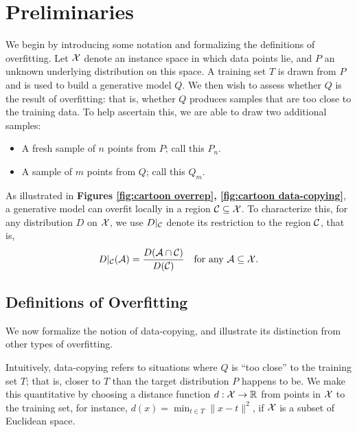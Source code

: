 \section{Preliminaries}

We begin by introducing some notation and formalizing the definitions of overfitting. Let ${\mathcal X}$ denote an instance space in which data points lie, and $P$ an unknown underlying distribution on this space. A training set $T$ is drawn from $P$ and is used to build a generative model $Q$. We then wish to assess whether $Q$ is the result of overfitting: that is, whether $Q$ produces samples that are too close to the training data. To help ascertain this, we are able to draw two additional samples:
\begin{itemize}
\item A fresh sample of $n$ points from $P$; call this $P_n$.
\item A sample of $m$ points from $Q$; call this $Q_m$.
\end{itemize}
As illustrated in \textbf{Figures \ref{fig:cartoon overrep}, \ref{fig:cartoon data-copying}}, a generative model can overfit locally in a region $\mathcal{C} \subseteq \mathcal{X}$. To characterize this, for any distribution $D$ on $\mathcal{X}$, we use $D|_{\mathcal{C}}$ denote its restriction to the region $\mathcal{C}$, that is, 
\begin{align*}
    D|_{\mathcal{C}}(\mathcal{A}) = \frac{D(\mathcal{A} \cap \mathcal{C})}{D(\mathcal{C})} 
    \quad \text{for any $\mathcal{A} \subseteq {\mathcal X}$.}
\end{align*}
 

\subsection{Definitions of Overfitting}
\label{sec:types of overfitting}
We now formalize the notion of data-copying, and illustrate its distinction from other types of overfitting. 

Intuitively, data-copying refers to situations where $Q$ is ``too close'' to the training set $T$; that is, closer to $T$ than the target distribution $P$ happens to be. We make this quantitative by choosing a distance function $d: {\mathcal X} \rightarrow {\mathbb R}$ from points in ${\mathcal X}$ to the training set, for instance, $d(x) = \min_{t \in T} \|x - t\|^2$, if ${\mathcal X}$ is a subset of Euclidean space. 

